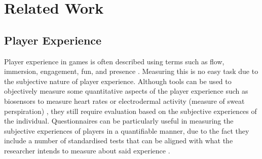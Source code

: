 \documentclass[journal]{IEEEtran}
\begin{document}
\section{Related Work}

\subsection{Player Experience}
Player experience in games is often described using terms such as flow, immersion, engagement, fun, and presence \cite{isbister2008game} \cite{czikszentmihalyi1990flow} \cite{mcmahan2013immersion}. Measuring this is no easy task due to the subjective nature of player experience. Although tools can be used to objectively measure some quantitative aspects of the player experience such as biosensors to measure heart rates  or electrodermal activity (measure of sweat perspiration)\cite{mikami2017adaptable} \cite{ambinder2011biofeedback} \cite{liu2009dynamic}, they still require evaluation based on the subjective experiences of the individual. Questionnaires can be particularly useful in measuring the subjective experiences of players in a quantifiable manner, due to the fact they include a number of standardised tests that can be aligned with what the researcher intends to measure about said experience \cite{ijsselsteijn2013game}.
\end{document}
